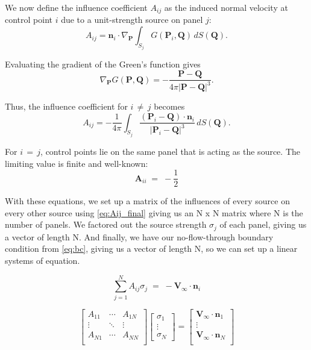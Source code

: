 \documentclass[conf]{new-aiaa} %
\begin{document}
We now define the influence coefficient $A_{ij}$ as the induced normal velocity at control point $i$ due to a unit-strength source on panel $j$:
\begin{equation}
A_{ij} = \mathbf{n}_i \cdot \nabla_{\mathbf{P}}
\int_{S_j} G(\mathbf{P}_i, \mathbf{Q}) \, dS(\mathbf{Q}).
\label{eq:Aij_def}
\end{equation}

Evaluating the gradient of the Green’s function gives
\begin{equation}
\nabla_{\mathbf{P}} G(\mathbf{P}, \mathbf{Q})
= - \frac{\mathbf{P} - \mathbf{Q}}{4\pi |\mathbf{P} - \mathbf{Q}|^3}.
\end{equation}

Thus, the influence coefficient for $i\,\neq\,j$ becomes
\begin{equation}
A_{ij} = -\frac{1}{4\pi} \int_{S_j}
\frac{(\mathbf{P}_i - \mathbf{Q}) \cdot \mathbf{n}_i}
{|\mathbf{P}_i - \mathbf{Q}|^3} \, dS(\mathbf{Q}).
\label{eq:Aij_final}
\end{equation}

For $i\,=\,j$, control points lie on the same panel that is acting as the source. 
The limiting value is finite and well-known:
\[\mathbf{A}_{ii} \;=\; -\frac{1}{2}\]

With these equations, we set up a matrix of the influences of every source on every other source using \autoref{eq:Aij_final} giving us an N x N matrix where N is the number of panels.
We factored out the source strength $\sigma_j$ of each panel, giving us a vector of length N. 
And finally, we have our no-flow-through boundary condition from \autoref{eq:bc}, giving us a vector of length N, so we can set up a linear systems of equation. 

\begin{equation}
	\sum_{j=1}^{N} A_{ij} \sigma_j \;=\; -\mathbf{V}_\infty \cdot \mathbf{n}_i
	\label{eq:systems}
\end{equation}

\[
\begin{bmatrix}
A_{11} & \cdots & A_{1N} \\
\vdots & \ddots & \vdots \\
A_{N1} & \cdots & A_{NN} \\
\end{bmatrix}
\begin{bmatrix}
\sigma_1 \\ \vdots \\ \sigma_N
\end{bmatrix}
=
\begin{bmatrix}
\mathbf{V}_\infty \cdot \mathbf{n}_1 \\
\vdots \\
\mathbf{V}_\infty \cdot \mathbf{n}_N \\
\end{bmatrix}
\]
\end{document}
